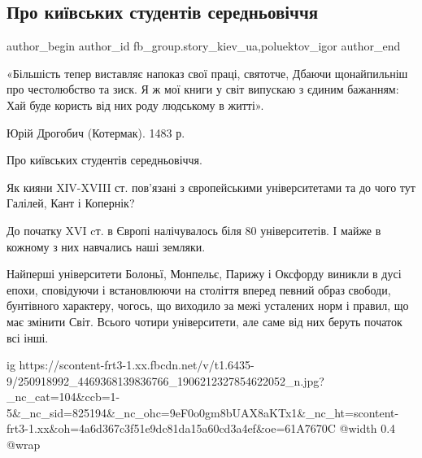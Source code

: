  
 
 
 
 
 
\subsection{Про київських студентів середньовіччя}
\label{sec:31_10_2021.fb.fb_group.story_kiev_ua.1.kievljane_universitety_srednevekovie}
 
\ifcmt
 author_begin
   author_id fb_group.story_kiev_ua,poluektov_igor
 author_end
\fi

\begin{cmtfront}

«Більшість тепер виставляє напоказ свої праці, святотче,
Дбаючи щонайпильніш про честолюбство та зиск.
Я ж мої книги у світ випускаю з єдиним бажанням:
Хай буде користь від них роду людському в житті». 

Юрій Дрогобич (Котермак). 1483 р.
\end{cmtfront}

Про київських студентів середньовіччя.

Як кияни XІV-XVIII ст. пов’язані з європейськими університетами та до чого тут
Галілей, Кант і Копернік?

До початку XVI cт. в Європі налічувалось біля 80 університетів. І майже в
кожному з них навчались наші земляки. 

Найперші університети Болоньї, Монпельє, Парижу і Оксфорду виникли в дусі
епохи, сповідуючи і встановлюючи на століття вперед певний образ свободи,
бунтівного характеру, чогось, що виходило за межі усталених норм і правил, що
має змінити Світ. Всього чотири університети, але саме від них беруть початок
всі інші.

\ifcmt
  ig https://scontent-frt3-1.xx.fbcdn.net/v/t1.6435-9/250918992_4469368139836766_1906212327854622052_n.jpg?_nc_cat=104&ccb=1-5&_nc_sid=825194&_nc_ohc=9eF0o0gm8bUAX8aKTx1&_nc_ht=scontent-frt3-1.xx&oh=4a6d367c3f51e9dc81da15a60cd3a4ef&oe=61A7670C
  @width 0.4
  @wrap 
\fi

